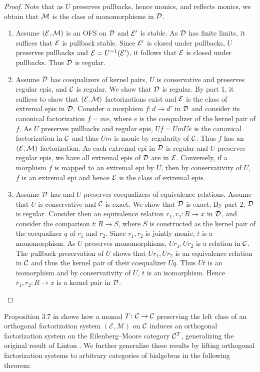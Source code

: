 \begin{proof} Note that as $U$ preserves pullbacks, hence monics, and reflects monics, we obtain that $\mathcal{M}$ is the class of monomorphisms in $\mathcal{D}$. 
    \begin{enumerate}
        \item Assume $(\mathcal{E},\mathcal{M})$ is an OFS on $\mathcal{D}$ and $\mathcal{E}'$ is stable. As $\mathcal{D}$ has finite limits, it suffices that $\mathcal{E}$ is pullback stable. Since $\mathcal{E}'$ is closed under pullbacks, $U$ preserves pullbacks and $\mathcal{E} = U^{-1}(\mathcal{E}')$, it follows that $\mathcal{E}$ is closed under pullbacks. Thus $\mathcal{D}$ is regular.
        \item Assume $\mathcal{D}$ has coequalizers of kernel pairs, $U$ is conservative and preserves regular epis, and $\mathcal{C}$ is regular. We show that $\mathcal{D}$ is regular. By part 1, it suffices to show that $(\mathcal{E},\mathcal{M})$ factorizations exist and $\mathcal{E}$ is the class of extremal epis in $\mathcal{D}$. Consider a morphism $f\colon d\to d'$ in $\mathcal{D}$ and consider its canonical factorization $f = me$, where $e$ is the coequalizer of the kernel pair of $f$. As $U$ preserves pullbacks and regular epis, $Uf = Um Ue$ is the canonical factorization in $\mathcal{C}$ and thus $Um$ is monic by regularity of $\mathcal{C}$. Thus $f$ has an $(\mathcal{E},\mathcal{M})$ factorization. As each extremal epi in $\mathcal{D}$ is regular and $U$ preserves regular epis, we have all extremal epis of $\mathcal{D}$ are in $\mathcal{E}$. Conversely, if a morphism $f$ is mapped to an extremal epi by $U$, then by conservativity of $U$, $f$ is an extremal epi and hence $\mathcal{E}$ is the class of extremal epis.
        \item Assume $\mathcal{D}$ has and $U$ preserves coequalizers of equivalence relations. Assume that $U$ is conservative and $\mathcal{C}$ is exact. We show that $\mathcal{D}$ is exact. By part $2$, $\mathcal{D}$ is regular. Consider then an equivalence relation $r_1,r_2\colon R\to x$ in $\mathcal{D}$, and consider the comparison $t\colon R\to S$, where $S$ is constructed as the kernel pair of the coequalizer $q$ of $r_1$ and $r_2$. Since $r_1,r_2$ is jointly monic, $t$ is a monomorphism. As $U$ preserves monomorphisms, $Ur_1,Ur_2$ is a relation in $\mathcal{C}$. The pullback preservation of $U$ shows that $Ur_1,Ur_2$ is an equivalence relation in $\mathcal{C}$ and thus the kernel pair of their coequalizer $Uq$. Thus $Ut$ is an isomorphism and by conservativity of $U$, $t$ is an isomorphism. Hence $r_1,r_2\colon R\to x$ is a kernel pair in $\mathcal{D}$. \qedhere
    \end{enumerate}


\end{proof}

Proposition 3.7 in \cite{Wissmann2022Minimality} shows how a monad $T\colon \mathcal{C}\to \mathcal{C}$ preserving the left class of an orthogonal factorization system $(\mathcal{E},\mathcal{M})$ on $\mathcal{C}$ induces an orthogonal factorization system on the Eilenberg--Moore category $\mathcal{C}^T$, generalizing the original result of Linton \cite{Linton1969}. We further generalize these results by lifting orthogonal factorization systems to arbitrary categories of bialgebras in the following theorem:

